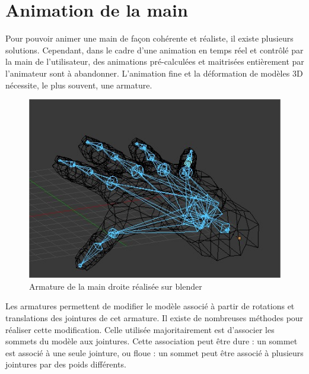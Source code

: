 

\section{Animation de la main}

Pour pouvoir animer une main de façon cohérente et réaliste, il existe plusieurs solutions.
Cependant, dans le cadre d'une animation en temps réel et contrôlé par la main de l'utilisateur, des animations pré-calculées et maitrisées entièrement par l'animateur sont à abandonner.
L'animation fine et la déformation de modèles 3D nécessite, le plus souvent, une armature.\newline


\begin{figure}[!h]
	\centering
	\includegraphics[width=14cm]{images/SkellHand.jpg}
	\caption{Armature de la main droite réalisée sur blender}
\end{figure}

Les armatures permettent de modifier le modèle associé à partir de rotations et translations des jointures de cet armature.
Il existe de nombreuses méthodes pour réaliser cette modification.
Celle utilisée majoritairement est d'associer les sommets du modèle aux jointures.
Cette association peut être dure : un sommet est associé à une seule jointure, ou floue : un sommet peut être associé à plusieurs jointures par des poids différents.\newline

